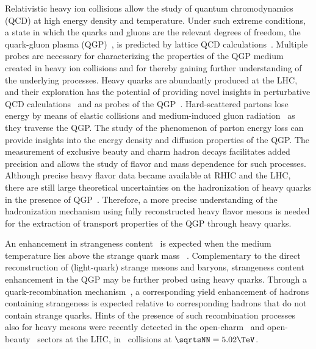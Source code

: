 \documentclass[11pt,twoside,a4paper,cmspaper]{cms-tdr}
\begin{document}
Relativistic heavy ion collisions allow the study of quantum chromodynamics (QCD) at high energy density and temperature. Under such extreme conditions, a state in which the quarks and gluons are the relevant degrees of freedom, the quark-gluon plasma (QGP)~\cite{QGP1,QGP2}, is predicted by lattice QCD calculations~\cite{Karsch:2003jg}.
%
Multiple probes are necessary for characterizing the properties of the QGP medium created in heavy ion collisions and for thereby gaining further understanding of the underlying processes.
%
Heavy quarks are abundantly produced at the LHC, and their exploration has the potential of providing novel insights in perturbative QCD calculations~\cite{Andronic:2015wma} and as probes of the QGP~\cite{Dong:2019byy}.
%
Hard-scattered partons lose energy by means of elastic collisions and medium-induced gluon radiation~\cite{Eloss1,Baier:2000mf,Chatrchyan:2011sx,Aad:2010bu,Andronic:2015wma} as they traverse the QGP.
The study of the phenomenon of parton energy loss can provide insights into the energy density and diffusion properties of the QGP.
%
The measurement of exclusive beauty and charm hadron decays facilitates added precision and allows the study of flavor and mass dependence for such processes. 
%
Although precise heavy flavor data became available at RHIC and the LHC, there are still large theoretical uncertainties on the hadronization of heavy quarks in the presence of QGP~\cite{Rapp:2018qla}. Therefore, a more precise understanding of the hadronization mechanism using fully reconstructed heavy flavor mesons is needed for the extraction of transport properties of the QGP through heavy quarks. 

An enhancement in strangeness content~\cite{ALICE:2017jyt,Abelev:2013xaa,Agakishiev:2011ar,Abelev:2008zk,Arsene:2009jg,Adamczyk:2017wsl,Adare:2015ema} is expected when the medium temperature lies above the strange quark mass ~\cite{PhysRevLett.48.1066}. Complementary to the direct reconstruction of (light-quark) strange mesons and baryons, %
strangeness content enhancement in the QGP may be further probed using heavy quarks.
%
Through a quark-recombination mechanism~\cite{Molnar:2003ff,Greco:2003mm,Greco:2003vf,Andronic:2015wma,He:2014cla}, a corresponding yield enhancement of hadrons containing strangeness is expected relative to corresponding hadrons that do not contain strange quarks. 
%
Hints of the presence of such recombination processes also for heavy mesons were recently detected in the open-charm~\cite{Acharya:2018hre} and open-beauty~\cite{BsPbPbCMS} sectors at the LHC, in \PbPb\ collisions at $\sqrtsNN=5.02\TeV$. 
\end{document}
